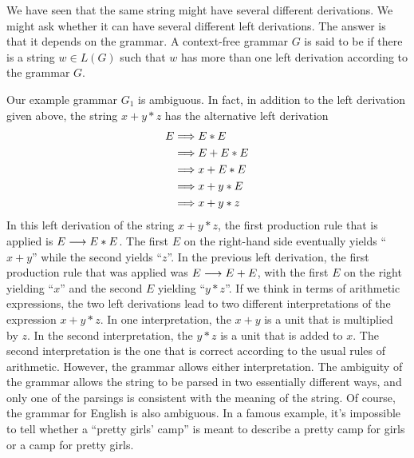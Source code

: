 We have seen that the same string might have several different derivations.
We might ask whether it can have several different left derivations.
The answer is that it depends on the grammar.  A context-free
grammar $G$ is said to be 
if there is a string $w\in L(G)$ such that $w$ has more than one
left derivation according to the grammar $G$.

Our example grammar $G_1$ is ambiguous.  In fact, in addition to the
left derivation given above, the string $x+y*z$ has the alternative
left derivation
\begin{align*}
   E &\Longrightarrow E*E\\
     &\Longrightarrow E+E*E\\
     &\Longrightarrow x+E*E\\
     &\Longrightarrow x+y*E\\
     &\Longrightarrow x+y*z
\end{align*}
In this left derivation of the string $x+y*z$, the first production
rule that is applied is $E\longrightarrow E*E$.  The first $E$ on the right-hand
side eventually yields ``$x+y$'' while the second yields ``$z$''.
In the previous left derivation, the first production rule that was
applied was $E\longrightarrow E+E$, with the first $E$ on the right yielding
``$x$'' and the second $E$ yielding ``$y*z$''.  If we think in terms
of arithmetic expressions, the two left derivations lead to
two different interpretations of the expression $x+y*z$.  In one
interpretation, the $x+y$ is a unit that is multiplied by $z$.
In the second interpretation, the $y*z$ is a unit that is added to $x$.
The second interpretation is the one that is correct according to
the usual rules of arithmetic.  However, the grammar allows either
interpretation.  The ambiguity of the grammar allows the string to
be parsed in two essentially different ways, and only one of the
parsings is consistent with the meaning of the string.  Of course,
the grammar for English is also ambiguous.  In a famous example,
it's impossible to tell whether a ``pretty girls' camp'' is
meant to describe a pretty camp for girls or a camp for pretty girls.

